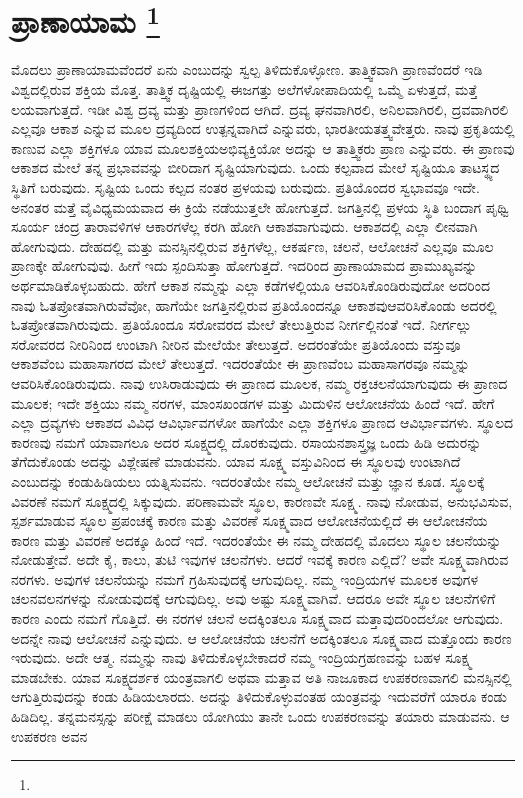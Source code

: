 
\vskip -0.5cm

\chapter[ಪ್ರಾನಾಯಾಮ ]{ಪ್ರಾಣಾಯಾಮ \protect\footnote{}}

ಮೊದಲು ಪ್ರಾಣಾಯಾಮವೆಂದರೆ ಏನು ಎಂಬುದನ್ನು ಸ್ವಲ್ಪ ತಿಳಿದುಕೊಳ್ಳೋಣ. ತಾತ್ತ್ವಿಕವಾಗಿ ಪ್ರಾಣವೆಂದರೆ ಇಡಿ ವಿಶ್ವದಲ್ಲಿರುವ ಶಕ್ತಿಯ ಮೊತ್ತ. ತಾತ್ತ್ವಿಕ ದೃಷ್ಟಿಯಲ್ಲಿ ಈ\break ಜಗತ್ತು ಅಲೆಗಳೋಪಾದಿಯಲ್ಲಿ ಒಮ್ಮೆ ಏಳುತ್ತದೆ, ಮತ್ತೆ ಲಯವಾಗುತ್ತದೆ. ಇಡೀ ವಿಶ್ವ ದ್ರವ್ಯ ಮತ್ತು ಪ್ರಾಣಗಳಿಂದ ಆಗಿದೆ. ದ್ರವ್ಯ ಘನವಾಗಿರಲಿ, ಅನಿಲವಾಗಿರಲಿ, ದ್ರವವಾಗಿರಲಿ ಎಲ್ಲವೂ ಆಕಾಶ ಎನ್ನುವ ಮೂಲ ದ್ರವ್ಯದಿಂದ ಉತ್ಪನ್ನವಾಗಿದೆ ಎನ್ನುವರು, ಭಾರತೀಯ\break ತತ್ತ್ವವೇತ್ತರು. ನಾವು ಪ್ರಕೃತಿಯಲ್ಲಿ ಕಾಣುವ ಎಲ್ಲಾ ಶಕ್ತಿಗಳೂ ಯಾವ ಮೂಲಶಕ್ತಿಯ\break ಅಭಿವ್ಯಕ್ತಿಯೋ ಅದನ್ನು ಆ ತಾತ್ತ್ವಿಕರು ಪ್ರಾಣ ಎನ್ನುವರು. ಈ ಪ್ರಾಣವು ಆಕಾಶದ ಮೇಲೆ ತನ್ನ ಪ್ರಭಾವವನ್ನು ಬೀರಿದಾಗ ಸೃಷ್ಟಿಯಾಗುವುದು. ಒಂದು ಕಲ್ಪವಾದ ಮೇಲೆ ಸೃಷ್ಟಿಯೂ ತಾಟಸ್ಥ್ಯದ ಸ್ಥಿತಿಗೆ ಬರುವುದು. ಸೃಷ್ಟಿಯ ಒಂದು ಕಲ್ಪದ ನಂತರ ಪ್ರಳಯವು ಬರುವುದು. ಪ್ರತಿಯೊಂದರ ಸ್ವಭಾವವೂ ಇದೇ. ಅನಂತರ ಮತ್ತೆ ವೈವಿಧ್ಯಮಯವಾದ ಈ ಕ್ರಿಯೆ ನಡೆಯುತ್ತಲೇ ಹೋಗುತ್ತದೆ. ಜಗತ್ತಿನಲ್ಲಿ ಪ್ರಳಯ ಸ್ಥಿತಿ ಬಂದಾಗ ಪೃಥ್ವಿ ಸೂರ್ಯ ಚಂದ್ರ ತಾರಾವಳಿಗಳ ಆಕಾರಗಳೆಲ್ಲ ಕರಗಿ ಹೋಗಿ ಆಕಾಶವಾಗುವುದು. ಆಕಾಶದಲ್ಲಿ ಎಲ್ಲಾ ಲೀನವಾಗಿ ಹೋಗುವುದು. ದೇಹದಲ್ಲಿ ಮತ್ತು ಮನಸ್ಸಿನಲ್ಲಿರುವ ಶಕ್ತಿಗಳೆಲ್ಲ, ಆಕರ್ಷಣ, ಚಲನೆ, ಆಲೋಚನೆ ಎಲ್ಲವೂ ಮೂಲ ಪ್ರಾಣಕ್ಕೇ ಹೋಗುವುವು. ಹೀಗೆ ಇದು ಸ್ಪಂದಿಸುತ್ತಾ ಹೋಗುತ್ತದೆ. ಇದರಿಂದ ಪ್ರಾಣಾಯಾಮದ ಪ್ರಾಮುಖ್ಯವನ್ನು ಅರ್ಥಮಾಡಿಕೊಳ್ಳಬಹುದು. ಹೇಗೆ ಆಕಾಶ ನಮ್ಮನ್ನು ಎಲ್ಲಾ ಕಡೆಗಳಲ್ಲಿಯೂ ಆವರಿಸಿಕೊಂಡಿರುವುದೋ ಅದರಿಂದ ನಾವು ಓತಪ್ರೋತವಾಗಿರುವೆವೋ, ಹಾಗೆಯೇ ಜಗತ್ತಿನಲ್ಲಿರುವ ಪ್ರತಿಯೊಂದನ್ನೂ ಆಕಾಶವು\break ಆವರಿಸಿಕೊಂಡು ಅದರಲ್ಲಿ ಓತಪ್ರೋತವಾಗಿರುವುದು. ಪ್ರತಿಯೊಂದೂ ಸರೋವರದ ಮೇಲೆ ತೇಲುತ್ತಿರುವ ನೀರ್ಗಲ್ಲಿನಂತೆ ಇದೆ. ನೀರ್ಗಲ್ಲು ಸರೋವರದ ನೀರಿನಿಂದ ಉಂಟಾಗಿ ನೀರಿನ ಮೇಲೆಯೇ ತೇಲುತ್ತದೆ. ಅದರಂತೆಯೇ ಪ್ರತಿಯೊಂದು ವಸ್ತುವೂ ಆಕಾಶವೆಂಬ ಮಹಾಸಾಗರದ ಮೇಲೆ ತೇಲುತ್ತದೆ. ಇದರಂತೆಯೇ ಈ ಪ್ರಾಣವೆಂಬ ಮಹಾಸಾಗರವೂ ನಮ್ಮನ್ನು ಆವರಿಸಿಕೊಂಡಿರುವುದು. ನಾವು ಉಸಿರಾಡುವುದು ಈ ಪ್ರಾಣದ ಮೂಲಕ, ನಮ್ಮ ರಕ್ತಚಲನೆಯಾಗುವುದು ಈ ಪ್ರಾಣದ ಮೂಲಕ; ಇದೇ ಶಕ್ತಿಯು ನಮ್ಮ ನರಗಳ, ಮಾಂಸಖಂಡಗಳ ಮತ್ತು ಮಿದುಳಿನ ಆಲೋಚನೆಯ ಹಿಂದೆ ಇದೆ. ಹೇಗೆ ಎಲ್ಲಾ ದ್ರವ್ಯಗಳು ಆಕಾಶದ ವಿವಿಧ ಆವಿರ್ಭಾವಗಳೋ ಹಾಗೆಯೇ ಎಲ್ಲಾ ಶಕ್ತಿಗಳೂ ಪ್ರಾಣದ ಆವಿರ್ಭಾವಗಳು. ಸ್ಥೂಲದ ಕಾರಣವು ನಮಗೆ ಯಾವಾಗಲೂ ಅದರ ಸೂಕ್ಷ್ಮದಲ್ಲಿ ದೊರಕುವುದು. ರಸಾಯನಶಾಸ್ತ್ರಜ್ಞ ಒಂದು ಹಿಡಿ ಅದುರನ್ನು ತೆಗೆದುಕೊಂಡು ಅದನ್ನು ವಿಶ್ಲೇಷಣೆ ಮಾಡುವನು. ಯಾವ ಸೂಕ್ಷ್ಮ ವಸ್ತುವಿನಿಂದ ಈ ಸ್ಥೂಲವು ಉಂಟಾಗಿದೆ ಎಂಬುದನ್ನು ಕಂಡುಹಿಡಿಯಲು ಯತ್ನಿಸುವನು. ಇದರಂತೆಯೇ ನಮ್ಮ ಆಲೋಚನೆ ಮತ್ತು ಜ್ಞಾನ ಕೂಡ. ಸ್ಥೂಲಕ್ಕೆ ವಿವರಣೆ ನಮಗೆ ಸೂಕ್ಷ್ಮದಲ್ಲಿ ಸಿಕ್ಕುವುದು. ಪರಿಣಾಮವೇ ಸ್ಥೂಲ, ಕಾರಣವೇ ಸೂಕ್ಷ್ಮ. ನಾವು ನೋಡುವ, ಅನುಭವಿಸುವ, ಸ್ಪರ್ಶಮಾಡುವ ಸ್ಥೂಲ ಪ್ರಪಂಚಕ್ಕೆ ಕಾರಣ ಮತ್ತು ವಿವರಣೆ ಸೂಕ್ಷ್ಮವಾದ ಆಲೋಚನೆಯಲ್ಲಿದೆ ಈ ಆಲೋಚನೆಯ ಕಾರಣ ಮತ್ತು ವಿವರಣೆ ಅದಕ್ಕೂ ಹಿಂದೆ ಇದೆ. ಇದರಂತೆಯೇ ಈ ನಮ್ಮ ದೇಹದಲ್ಲಿ ಮೊದಲು ಸ್ಥೂಲ ಚಲನೆಯನ್ನು ನೋಡುತ್ತೇವೆ. ಅದೇ ಕೈ, ಕಾಲು, ತುಟಿ ಇವುಗಳ ಚಲನೆಗಳು. ಆದರೆ ಇವಕ್ಕೆ ಕಾರಣ ಎಲ್ಲಿದೆ? ಅವೇ ಸೂಕ್ಷ್ಮವಾಗಿರುವ ನರಗಳು. ಅವುಗಳ ಚಲನೆಯನ್ನು ನಮಗೆ ಗ್ರಹಿಸುವುದಕ್ಕೆ ಆಗುವುದಿಲ್ಲ. ನಮ್ಮ ಇಂದ್ರಿಯಗಳ ಮೂಲಕ ಅವುಗಳ ಚಲನವಲನಗಳನ್ನು ನೋಡುವುದಕ್ಕೆ ಆಗುವುದಿಲ್ಲ. ಅವು ಅಷ್ಟು ಸೂಕ್ಷ್ಮವಾಗಿವೆ. ಆದರೂ ಅವೇ ಸ್ಥೂಲ ಚಲನೆಗಳಿಗೆ ಕಾರಣ ಎಂದು ನಮಗೆ ಗೊತ್ತಿದೆ. ಈ ನರಗಳ ಚಲನೆ ಅದಕ್ಕಿಂತಲೂ ಸೂಕ್ಷ್ಮವಾದ ಮತ್ತಾವುದರಿಂದಲೋ ಆಗುವುದು. ಅದನ್ನೇ ನಾವು ಆಲೋಚನೆ ಎನ್ನುವುದು. ಆ ಆಲೋಚನೆಯ ಚಲನೆಗೆ ಅದಕ್ಕಿಂತಲೂ ಸೂಕ್ಷ್ಮವಾದ ಮತ್ತೊಂದು ಕಾರಣ ಇರುವುದು. ಅದೇ ಆತ್ಮ. ನಮ್ಮನ್ನು ನಾವು ತಿಳಿದುಕೊಳ್ಳಬೇಕಾದರೆ ನಮ್ಮ ಇಂದ್ರಿಯಗ್ರಹಣವನ್ನು ಬಹಳ ಸೂಕ್ಷ್ಮ ಮಾಡಬೇಕು. ಯಾವ ಸೂಕ್ಷ್ಮದರ್ಶಕ ಯಂತ್ರವಾಗಲಿ ಅಥವಾ ಮತ್ತಾವ ಅತಿ ನಾಜೂಕಾದ ಉಪಕರಣವಾಗಲಿ ಮನಸ್ಸಿನಲ್ಲಿ ಆಗುತ್ತಿರುವುದನ್ನು ಕಂಡು ಹಿಡಿಯಲಾರದು. ಅದನ್ನು ತಿಳಿದುಕೊಳ್ಳುವಂತಹ ಯಂತ್ರವನ್ನು ಇದುವರೆಗೆ ಯಾರೂ ಕಂಡು ಹಿಡಿದಿಲ್ಲ. ತನ್ನ\break ಮನಸ್ಸನ್ನು ಪರೀಕ್ಷೆ ಮಾಡಲು ಯೋಗಿಯು ತಾನೇ ಒಂದು ಉಪಕರಣವನ್ನು ತಯಾರು ಮಾಡುವನು. ಆ ಉಪಕರಣ ಅವನ 